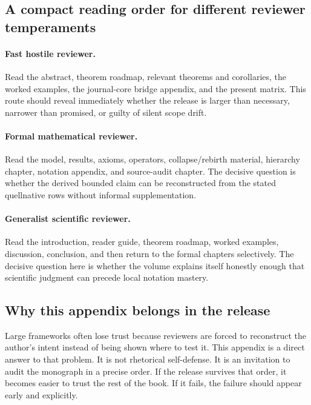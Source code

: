 \subsection{A compact reading order for different reviewer temperaments}

\paragraph{Fast hostile reviewer.}
Read the abstract, theorem roadmap, relevant theorems and corollaries, the worked examples,
the journal-core bridge appendix, and the present matrix. This route should reveal immediately
whether the release is larger than necessary, narrower than promised, or guilty of silent scope
drift.

\paragraph{Formal mathematical reviewer.}
Read the model, results, axioms, operators, collapse/rebirth material, hierarchy chapter,
notation appendix, and source-audit chapter. The decisive question is whether the derived bounded
claim can be reconstructed from the stated quellnative rows without informal supplementation.

\paragraph{Generalist scientific reviewer.}
Read the introduction, reader guide, theorem roadmap, worked examples, discussion, conclusion,
and then return to the formal chapters selectively. The decisive question here is whether the
volume explains itself honestly enough that scientific judgment can precede local notation
mastery.

\subsection{Why this appendix belongs in the release}

Large frameworks often lose trust because reviewers are forced to reconstruct the author's intent
instead of being shown where to test it. This appendix is a direct answer to that problem. It is
not rhetorical self-defense. It is an invitation to audit the monograph in a precise order.
If the release survives that order, it becomes easier to trust the rest of the book. If it fails,
the failure should appear early and explicitly.


